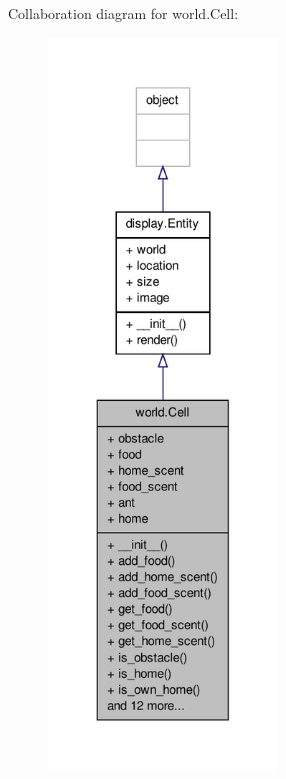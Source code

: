 Collaboration diagram for world.\+Cell\+:
\nopagebreak
\begin{figure}[H]
\begin{center}
\leavevmode
\includegraphics[height=550pt]{classworld_1_1Cell__coll__graph}
\end{center}
\end{figure}

